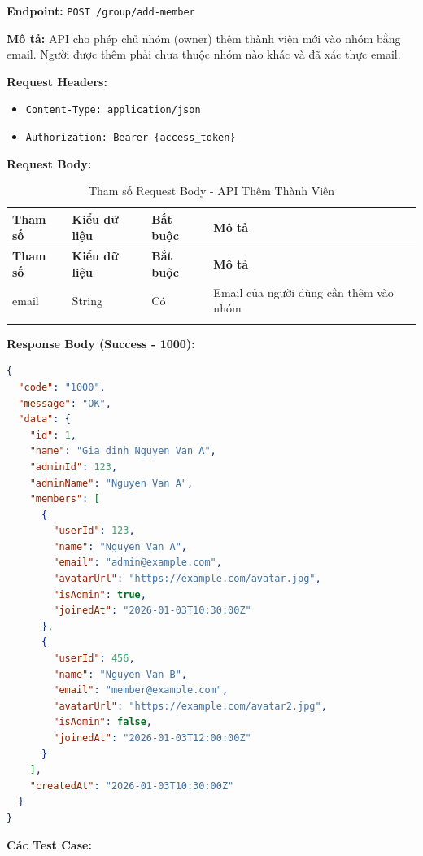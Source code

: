 \textbf{Endpoint:} \texttt{POST /group/add-member}

\textbf{Mô tả:} API cho phép chủ nhóm (owner) thêm thành viên mới vào nhóm bằng email. Người được thêm phải chưa thuộc nhóm nào khác và đã xác thực email.

\textbf{Request Headers:}
\begin{itemize}
    \item \texttt{Content-Type: application/json}
    \item \texttt{Authorization: Bearer \{access\_token\}}
\end{itemize}

\textbf{Request Body:}

\small
\begin{longtable}{|>{\raggedright\arraybackslash}p{3.5cm}|>{\raggedright\arraybackslash}p{2.5cm}|>{\raggedright\arraybackslash}p{2cm}|>{\raggedright\arraybackslash}p{5.5cm}|}
\hline
\textbf{Tham số} & \textbf{Kiểu dữ liệu} & \textbf{Bắt buộc} & \textbf{Mô tả} \\
\hline
\endfirsthead
\hline
\textbf{Tham số} & \textbf{Kiểu dữ liệu} & \textbf{Bắt buộc} & \textbf{Mô tả} \\
\hline
\endhead
email & String & Có & Email của người dùng cần thêm vào nhóm \\
\hline
\caption{Tham số Request Body - API Thêm Thành Viên}
\end{longtable}

\textbf{Response Body (Success - 1000):}

\begin{lstlisting}[language=json, caption=Response thanh cong API 6.3]
{
  "code": "1000",
  "message": "OK",
  "data": {
    "id": 1,
    "name": "Gia dinh Nguyen Van A",
    "adminId": 123,
    "adminName": "Nguyen Van A",
    "members": [
      {
        "userId": 123,
        "name": "Nguyen Van A",
        "email": "admin@example.com",
        "avatarUrl": "https://example.com/avatar.jpg",
        "isAdmin": true,
        "joinedAt": "2026-01-03T10:30:00Z"
      },
      {
        "userId": 456,
        "name": "Nguyen Van B",
        "email": "member@example.com",
        "avatarUrl": "https://example.com/avatar2.jpg",
        "isAdmin": false,
        "joinedAt": "2026-01-03T12:00:00Z"
      }
    ],
    "createdAt": "2026-01-03T10:30:00Z"
  }
}
\end{lstlisting}

\textbf{Các Test Case:}


